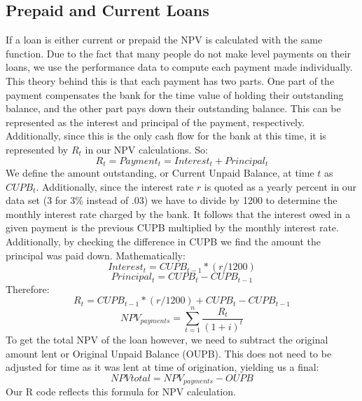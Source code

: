 \documentclass[12 pt]{uncw_thesis}
\theoremstyle{plain}
\theoremstyle{remark}
\theoremstyle{definition}
\begin{document}
\subsection{Prepaid and Current Loans}
If a loan is either current or prepaid the NPV is calculated with the same function. Due to the fact that many people do not make level payments on their loans, we use the performance data to compute each payment made individually. This theory behind this is that each payment has two parts. One part of the payment compensates the bank for the time value of holding their outstanding balance, and the other part pays down their outstanding balance. This can be represented as the interest and principal of the payment, respectively. Additionally, since this is the only cash flow for the bank at this time, it is represented by \(R_t\) in our NPV calculations.  So:
\[R_t = Payment_t = Interest_t + Principal_t\]
We define the amount outstanding, or Current Unpaid Balance, at time \(t\) as \(CUPB_t\). Additionally, since the interest rate \(r\) is quoted as a yearly percent in our data set (3 for 3\% instead of .03) we have to divide by 1200 to determine the monthly interest rate charged by the bank. It follows that the interest owed in a given payment is the previous CUPB multiplied by the monthly interest rate. Additionally, by checking the difference in CUPB we find the amount the principal was paid down. Mathematically:
\[Interest_t = CUPB_{t-1}*(r/1200)\]
\[Principal_t = CUPB_{t} - CUPB_{t-1}\]
Therefore: 
\[R_t = CUPB_{t-1}*(r/1200) + CUPB_{t} - CUPB_{t-1}\]
\[NPV_{payments} = \sum_{t=1}^n \frac{R_t}{(1+i)^t}\]
To get the total NPV of the loan however, we need to subtract the original amount lent or Original Unpaid Balance (OUPB). This does not need to be adjusted for time as it was lent at time of origination, yielding us a final:
\[NPV{total} = NPV_{payments} - OUPB\]
Our R code reflects this formula for NPV calculation.
\end{document}
